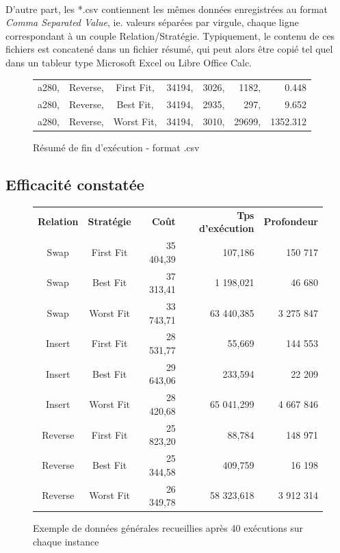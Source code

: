 \documentclass[a4paper,10pt]{report}
\begin{document}
\paragraph{}
  D'autre part, les *.csv contiennent les mêmes données enregistrées au format
\textit{Comma Separated Value}, ie. valeurs séparées par virgule, chaque ligne
correspondant à un couple Relation/Stratégie. Typiquement, le contenu de ces 
fichiers est concatené dans un fichier résumé, qui peut alors être copié tel
quel dans un tableur type Microsoft Excel ou Libre Office Calc.

\begin{figure}[h]
  \begin{center}
    \begin{tabular}{cccrrrr}
      a280, &Reverse, &First Fit, &34194, &3026, &1182, &0.448\\
      a280, &Reverse, &Best Fit,  &34194, &2935, &297,  &9.652\\
      a280, &Reverse, &Worst Fit, &34194, &3010, &29699,&1352.312\\
    \end{tabular}
  \end{center}
  \label{a280-sample-csv}
  \caption{Résumé de fin d'exécution - format .csv}
\end{figure}

\subsection{Efficacité constatée}

\begin{figure}[h]
  \begin{center}
    \begin{tabular}{ccrrr}
      \textbf{Relation}& \textbf{Stratégie}& \textbf{Coût}& \textbf{Tps
d'exécution}& \textbf{Profondeur}\\
      Swap&	First Fit&	35 404,39&	107,186&	150 717\\
      Swap&	Best Fit&	37 313,41&	1 198,021&	46 680\\
      Swap&	Worst Fit&	33 743,71&	63 440,385&	3 275 847\\
      Insert&	First Fit&	28 531,77&	55,669&		144 553\\
      Insert&	Best Fit&	29 643,06&	233,594&	22 209\\
      Insert&	Worst Fit&	28 420,68&	65 041,299&	4 667 846\\
      Reverse&	First Fit&	25 823,20&	88,784&		148 971\\
      Reverse&	Best Fit&	25 344,58&	409,759&	16 198\\
      Reverse&	Worst Fit&	26 349,78&	58 323,618&	3 912 314\\
    \end{tabular}
  \end{center}
  \label{recap-general}
  \caption{Exemple de données générales recueillies après 40 exécutions sur
chaque instance}
\end{figure}
\end{document}
